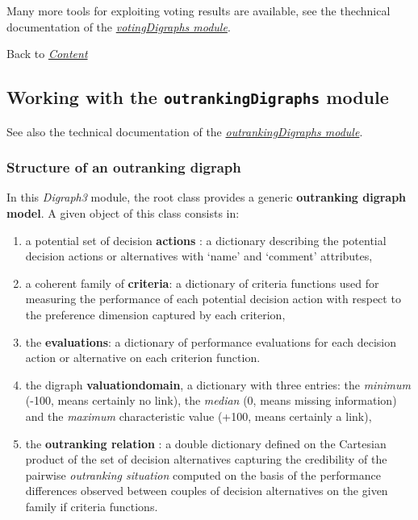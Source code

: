 \documentclass[letterpaper,10pt,english]{sphinxmanual}
\begin{document}
Many more tools for exploiting voting results are available, see the thechnical documentation of the {\hyperref[techDoc:votingdigraphs-label]{\emph{votingDigraphs module}}}.

Back to {\hyperref[tutorial:tutorial-label]{\emph{Content}}}


\subsection{Working with the \texttt{outrankingDigraphs} module}
\label{tutorial:outrankingdigraphs-tutorial-label}\label{tutorial:working-with-the-outrankingdigraphs-module}
See also the technical documentation of the {\hyperref[techDoc:outrankingdigraphs-label]{\emph{outrankingDigraphs module}}}.


\subsubsection{Structure of an outranking digraph}
\label{tutorial:structure-of-an-outranking-digraph}
In this \emph{Digraph3} module, the root  class provides a generic \textbf{outranking digraph model}. A given object of this class consists in:
\begin{enumerate}
\item {} 
a potential set of decision \textbf{actions} : a dictionary describing the potential decision actions or alternatives with `name' and `comment' attributes,

\item {} 
a coherent family of \textbf{criteria}: a dictionary of criteria functions used for measuring the performance of each potential decision action with respect to the preference dimension captured by each criterion,

\item {} 
the \textbf{evaluations}: a dictionary of performance evaluations for each decision action or alternative on each criterion function.

\item {} 
the digraph \textbf{valuationdomain}, a dictionary with three entries: the \emph{minimum} (-100, means certainly no link), the \emph{median} (0, means missing information) and the \emph{maximum} characteristic value (+100, means certainly a link),

\item {} 
the \textbf{outranking relation} : a double dictionary defined on the Cartesian product of the set of decision alternatives capturing the credibility of the pairwise \emph{outranking situation} computed on the basis of the performance differences observed between couples of decision alternatives on the given family if criteria functions.

\end{enumerate}
\end{document}

